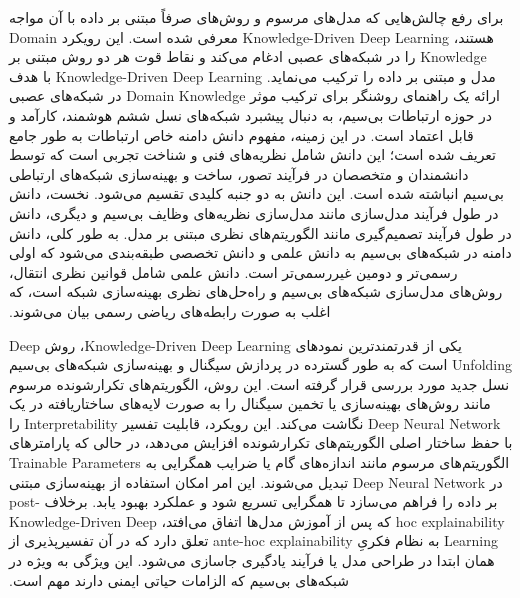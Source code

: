 ‫برای رفع چالش‌هایی که مدل‌های مرسوم و روش‌های صرفاً مبتنی بر داده با آن مواجه هستند،
\gls{Knowledge-Driven Deep Learning}
 معرفی شده است. این رویکرد 
\gls{Domain Knowledge}
  را در شبکه‌های عصبی ادغام می‌کند و نقاط قوت هر دو روش مبتنی بر مدل و مبتنی بر داده را ترکیب می‌نماید.
\gls{Knowledge-Driven Deep Learning}
   با هدف ارائه یک راهنمای روشنگر برای ترکیب موثر 
\gls{Domain Knowledge}
    در شبکه‌های عصبی در حوزه ارتباطات بی‌سیم، به دنبال پیشبرد شبکه‌های نسل ششم هوشمند، کارآمد و قابل اعتماد است. در این زمینه، مفهوم دانش دامنه خاص ارتباطات به طور جامع تعریف شده است؛ این دانش شامل نظریه‌های فنی و شناخت تجربی است که توسط دانشمندان و متخصصان در فرآیند تصور، ساخت و بهینه‌سازی شبکه‌های ارتباطی بی‌سیم انباشته شده است. این دانش به دو جنبه کلیدی تقسیم می‌شود. نخست، دانش در طول فرآیند مدل‌سازی مانند مدل‌سازی نظریه‌های وظایف بی‌سیم و دیگری، دانش در طول فرآیند تصمیم‌گیری مانند الگوریتم‌های نظری مبتنی بر مدل. به طور کلی، دانش دامنه در شبکه‌های بی‌سیم به دانش علمی و دانش تخصصی طبقه‌بندی می‌شود که اولی رسمی‌تر و دومین غیررسمی‌تر است. دانش علمی شامل قوانین نظری انتقال، روش‌های مدل‌سازی شبکه‌های بی‌سیم و راه‌حل‌های نظری بهینه‌سازی شبکه است، که اغلب به صورت رابطه‌های ریاضی رسمی بیان می‌شوند.‬
   
‫یکی از قدرتمندترین نمودهای 
\gls{Knowledge-Driven Deep Learning}،
 روش 
\gls{Deep Unfolding}
 است که به طور گسترده در پردازش سیگنال و بهینه‌سازی شبکه‌های بی‌سیم نسل جدید مورد بررسی قرار گرفته است. این روش، الگوریتم‌های تکرارشونده مرسوم مانند روش‌های بهینه‌سازی یا تخمین سیگنال را به صورت لایه‌های ساختاریافته در یک 
\gls{Deep Neural Network}
نگاشت می‌کند. این رویکرد، قابلیت تفسیر 
\gls{Interpretability}
  را با حفظ ساختار اصلی الگوریتم‌های تکرارشونده افزایش می‌دهد، در حالی که پارامترهای الگوریتم‌های مرسوم مانند اندازه‌های گام یا ضرایب همگرایی به 
\glspl{Trainable Parameter}
   در 
\gls{Deep Neural Network}
    تبدیل می‌شوند. این امر امکان استفاده از بهینه‌سازی مبتنی بر داده را فراهم می‌سازد تا همگرایی تسریع شود و عملکرد بهبود یابد. برخلاف 
\gls{post-hoc explainability}   
   که پس از آموزش مدل‌ها اتفاق می‌افتد،
\gls{Knowledge-Driven Deep Learning}
     به نظام فکریِ
\gls{ante-hoc explainability}     
     تعلق دارد که در آن تفسیرپذیری از همان ابتدا در طراحی مدل یا فرآیند یادگیری جاسازی می‌شود. این ویژگی به ویژه در شبکه‌های بی‌سیم که الزامات حیاتی ایمنی دارند مهم است.‬
     
